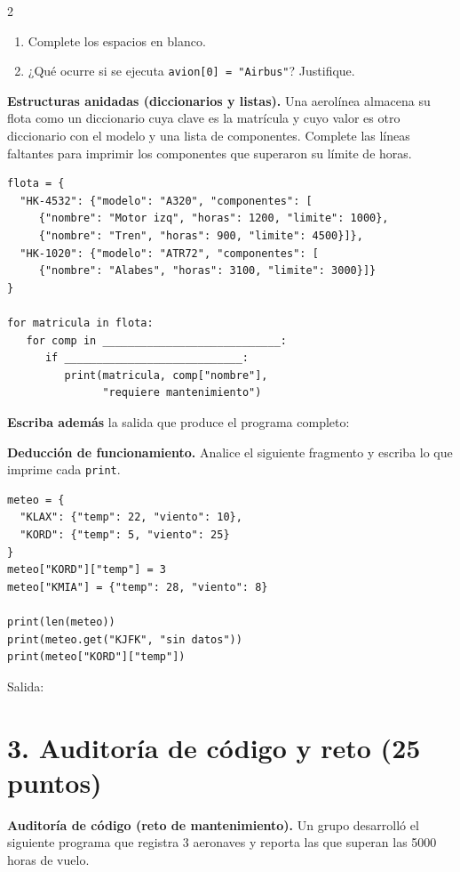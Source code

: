 \documentclass[addpoints,10pt]{exam}
\begin{document}
\begin{multicols}{2}
\begin{questions}
			\begin{enumerate}
				\item Complete los espacios en blanco.
				\item ¿Qué ocurre si se ejecuta \texttt{avion[0] = "Airbus"}? Justifique.
			\end{enumerate}
			
			\makeemptybox{2cm}
			
			\question[15]
			\textbf{Estructuras anidadas (diccionarios y listas).} Una aerolínea almacena su flota como un diccionario cuya clave es la matrícula y cuyo valor es otro diccionario con el modelo y una lista de componentes. Complete las líneas faltantes para imprimir los componentes que superaron su límite de horas.
			
\begin{lstlisting}
flota = {
  "HK-4532": {"modelo": "A320", "componentes": [
     {"nombre": "Motor izq", "horas": 1200, "limite": 1000},
     {"nombre": "Tren", "horas": 900, "limite": 4500}]},
  "HK-1020": {"modelo": "ATR72", "componentes": [
     {"nombre": "Alabes", "horas": 3100, "limite": 3000}]}
}

for matricula in flota:
   for comp in ____________________________:
      if ____________________________:
         print(matricula, comp["nombre"],
               "requiere mantenimiento")
\end{lstlisting}
			
			\textbf{Escriba además} la salida que produce el programa completo:
			\makeemptybox{2cm}
			
			\question[10]
			\textbf{Deducción de funcionamiento.} Analice el siguiente fragmento y escriba lo que imprime cada \texttt{print}.
			
\begin{lstlisting}
meteo = {
  "KLAX": {"temp": 22, "viento": 10},
  "KORD": {"temp": 5, "viento": 25}
}
meteo["KORD"]["temp"] = 3
meteo["KMIA"] = {"temp": 28, "viento": 8}

print(len(meteo))
print(meteo.get("KJFK", "sin datos"))
print(meteo["KORD"]["temp"])
\end{lstlisting}
			
			Salida:
			\makeemptybox{2.5cm}
			
			\section*{3. Auditoría de código y reto (25 puntos)}
			
			\question[15]
			\textbf{Auditoría de código (reto de mantenimiento).} Un grupo desarrolló el siguiente programa que registra 3 aeronaves y reporta las que superan las 5000 horas de vuelo.
			

\end{questions}
\end{multicols}
\end{document}
